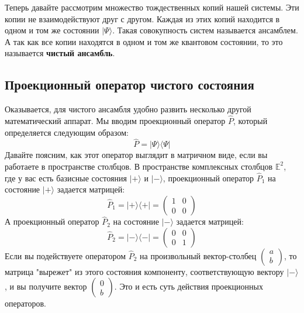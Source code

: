 \documentclass[../general/general]{subfiles}
\begin{document}
Теперь давайте рассмотрим множество тождественных копий нашей системы. Эти копии не взаимодействуют друг с другом. 
Каждая из этих копий находится в одном и том же состоянии $|\Psi\rangle$. Такая совокупность систем называется ансамблем. А так как все копии находятся в одном и том же квантовом состоянии, то это называется \textbf{чистый ансамбль}. 

\subsection{Проекционный оператор чистого состояния}

Оказывается, для чистого ансамбля удобно развить несколько другой математический аппарат. Мы вводим проекционный оператор $\hat{P}$, который определяется следующим образом:
\begin{equation}
    \hat{P} = |\Psi\rangle \langle \Psi|
\end{equation}
Давайте поясним, как этот оператор выглядит в матричном виде, если вы работаете в пространстве столбцов. В пространстве комплексных столбцов $\mathbb{E}^2$, где у вас есть базисные состояния $|+\rangle$ и $|-\rangle$, проекционный оператор $\hat{P}_1$ на состояние $|+\rangle$ задается матрицей:
\begin{equation}
    \hat{P}_1 = |+\rangle\langle+| = \begin{pmatrix} 1 & 0 \\ 0 & 0 \end{pmatrix}
\end{equation}
А проекционный оператор $\hat{P}_2$ на состояние $|-\rangle$ задается матрицей:
\begin{equation}
    \hat{P}_2 = |-\rangle\langle-| = \begin{pmatrix} 0 & 0 \\ 0 & 1 \end{pmatrix}
\end{equation}
Если вы подействуете оператором $\hat{P}_2$ на произвольный вектор-столбец $\begin{pmatrix} a \\ b \end{pmatrix}$, то матрица "вырежет" из этого состояния компоненту, соответствующую вектору $|-\rangle$, и вы получите вектор $\begin{pmatrix} 0 \\ b \end{pmatrix}$. Это и есть суть действия проекционных операторов.
\end{document}
